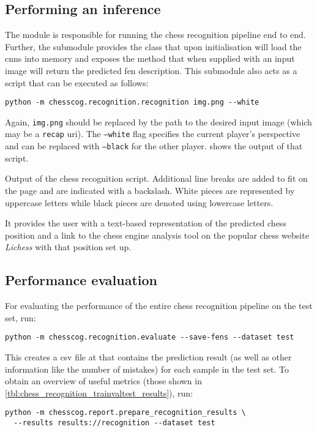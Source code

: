 \documentclass[../../report.tex]{subfiles}
\begin{document}
\subsection{Performing an inference}
\label{sec:chesscog_user_man_perform_inference}
The  module is responsible for running the chess recognition pipeline end to end.
Further, the  submodule provides the  class that upon initialisation will load the \glspl{cnn} into memory and exposes the  method that when supplied with an input image will return the predicted \gls{fen} description.
This submodule also acts as a script that can be executed as follows:
\begin{verbatim}
python -m chesscog.recognition.recognition img.png --white
\end{verbatim}
Again, \texttt{img.png} should be replaced by the path to the desired input image (which may be a \texttt{recap} \gls{uri}).
The \texttt{--white} flag specifies the current player's perspective and can be replaced with \texttt{--black} for the other player.
 shows the output of that script.
\begin{listing}
    
    \caption[Output of the chess recognition script.]{Output of the chess recognition script. Additional line breaks are added to fit on the page and are indicated with a backslash. White pieces are represented by uppercase letters while black pieces are denoted using lowercase letters.}
    \label{lst:chesscog_recognition_output}
\end{listing}
It provides the user with a text-based representation of the predicted chess position and a link to the chess engine analysis tool on the popular chess website \emph{Lichess} with that position set up.

\subsection{Performance evaluation}
\label{sec:chesscog_user_man_evaluate}
For evaluating the performance of the entire chess recognition pipeline on the test set, run:
\begin{verbatim}
python -m chesscog.recognition.evaluate --save-fens --dataset test
\end{verbatim}
This creates a \gls{csv} file at  that contains the prediction result (as well as other information like the number of mistakes) for each sample in the test set.
To obtain an overview of useful metrics (those shown in \cref{tbl:chess_recognition_trainvaltest_results}), run:
\begin{verbatim}
python -m chesscog.report.prepare_recognition_results \
  --results results://recognition --dataset test
\end{verbatim}
\end{document}

